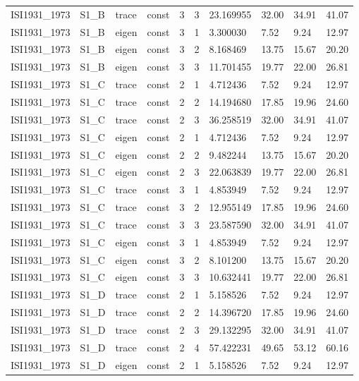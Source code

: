\begin{tabular}{llllllllll}
ISI1931\_1973 & S1\_B & trace & const & 3 & 3 & 23.169955 & 32.00 & 34.91 & 41.07 \\
ISI1931\_1973 & S1\_B & eigen & const & 3 & 1 & 3.300030 & 7.52 & 9.24 & 12.97 \\
ISI1931\_1973 & S1\_B & eigen & const & 3 & 2 & 8.168469 & 13.75 & 15.67 & 20.20 \\
ISI1931\_1973 & S1\_B & eigen & const & 3 & 3 & 11.701455 & 19.77 & 22.00 & 26.81 \\
ISI1931\_1973 & S1\_C & trace & const & 2 & 1 & 4.712436 & 7.52 & 9.24 & 12.97 \\
ISI1931\_1973 & S1\_C & trace & const & 2 & 2 & 14.194680 & 17.85 & 19.96 & 24.60 \\
ISI1931\_1973 & S1\_C & trace & const & 2 & 3 & 36.258519 & 32.00 & 34.91 & 41.07 \\
ISI1931\_1973 & S1\_C & eigen & const & 2 & 1 & 4.712436 & 7.52 & 9.24 & 12.97 \\
ISI1931\_1973 & S1\_C & eigen & const & 2 & 2 & 9.482244 & 13.75 & 15.67 & 20.20 \\
ISI1931\_1973 & S1\_C & eigen & const & 2 & 3 & 22.063839 & 19.77 & 22.00 & 26.81 \\
ISI1931\_1973 & S1\_C & trace & const & 3 & 1 & 4.853949 & 7.52 & 9.24 & 12.97 \\
ISI1931\_1973 & S1\_C & trace & const & 3 & 2 & 12.955149 & 17.85 & 19.96 & 24.60 \\
ISI1931\_1973 & S1\_C & trace & const & 3 & 3 & 23.587590 & 32.00 & 34.91 & 41.07 \\
ISI1931\_1973 & S1\_C & eigen & const & 3 & 1 & 4.853949 & 7.52 & 9.24 & 12.97 \\
ISI1931\_1973 & S1\_C & eigen & const & 3 & 2 & 8.101200 & 13.75 & 15.67 & 20.20 \\
ISI1931\_1973 & S1\_C & eigen & const & 3 & 3 & 10.632441 & 19.77 & 22.00 & 26.81 \\
ISI1931\_1973 & S1\_D & trace & const & 2 & 1 & 5.158526 & 7.52 & 9.24 & 12.97 \\
ISI1931\_1973 & S1\_D & trace & const & 2 & 2 & 14.396720 & 17.85 & 19.96 & 24.60 \\
ISI1931\_1973 & S1\_D & trace & const & 2 & 3 & 29.132295 & 32.00 & 34.91 & 41.07 \\
ISI1931\_1973 & S1\_D & trace & const & 2 & 4 & 57.422231 & 49.65 & 53.12 & 60.16 \\
ISI1931\_1973 & S1\_D & eigen & const & 2 & 1 & 5.158526 & 7.52 & 9.24 & 12.97 \\

\end{tabular}

